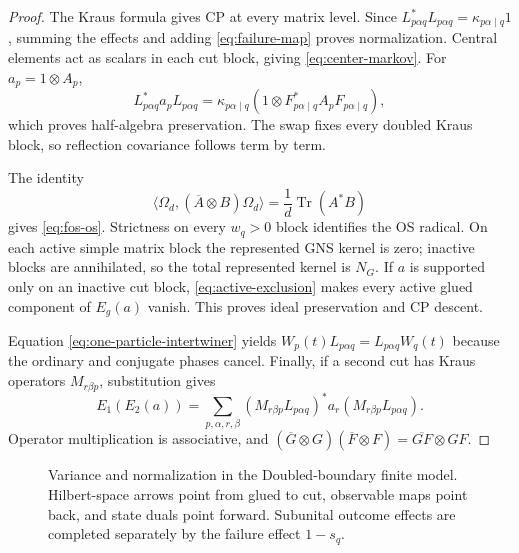 \documentclass[11pt,a4paper]{article}
\theoremstyle{definition}
\theoremstyle{remark}
\newcommand{\A}{\mathcal A}
\newcommand{\Hh}{\mathcal H}
\newcommand{\Tr}{\operatorname{Tr}}
\begin{document}
\begin{proof}
The Kraus formula gives CP at every matrix level.  Since
$L_{p\alpha q}^*L_{p\alpha q}=\kappa_{p\alpha\mid q}1$, summing the effects and adding
\eqref{eq:failure-map} proves normalization.  Central elements act as scalars in each
cut block, giving \eqref{eq:center-markov}.  For $a_p=1\otimes A_p$,
\[
 L_{p\alpha q}^*a_pL_{p\alpha q}
 =\kappa_{p\alpha\mid q}
    (1\otimes F_{p\alpha\mid q}^*A_pF_{p\alpha\mid q}),
\]
which proves half-algebra preservation.  The swap fixes every doubled Kraus block, so
reflection covariance follows term by term.

The identity
\begin{equation}
 \langle\Omega_d,(\overline A\otimes B)\Omega_d\rangle
 =\frac1d\Tr(A^*B)
 \label{eq:maxent-identity}
\end{equation}
gives \eqref{eq:fos-os}.  Strictness on every $w_q>0$ block identifies the OS radical.
On each active simple matrix block the represented GNS kernel is zero; inactive blocks
are annihilated, so the total represented kernel is $N_G$.  If $a$ is supported only on
an inactive cut block, \eqref{eq:active-exclusion} makes every active glued component of
$E_g(a)$ vanish.  This proves ideal preservation and CP descent.

Equation \eqref{eq:one-particle-intertwiner} yields
$W_p(t)L_{p\alpha q}=L_{p\alpha q}W_q(t)$ because the ordinary and conjugate phases
cancel.  Finally, if a second cut has Kraus operators $M_{r\beta p}$, substitution gives
\[
 E_1(E_2(a))=\sum_{p,\alpha,r,\beta}
 (M_{r\beta p}L_{p\alpha q})^*a_r(M_{r\beta p}L_{p\alpha q}).
\]
Operator multiplication is associative, and
$(\overline G\otimes G)(\overline F\otimes F)=\overline{GF}\otimes GF$.
\end{proof}

\begin{figure}[H]
\centering
{}
\caption{Variance and normalization in the Doubled-boundary finite model.  Hilbert-space
arrows point from glued to cut, observable maps point back, and state duals point
forward.  Subunital outcome effects are completed separately by the failure effect
$1-s_q$.}
\label{fig:route-variance}
\end{figure}
\end{document}
